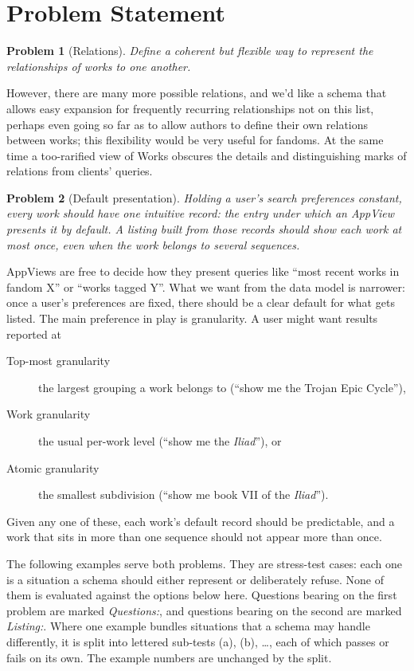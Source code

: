 \documentclass{amsart}
\newtheorem*{prob}{Problem}
\theoremstyle{remark}
\begin{document}
    \section{Problem Statement}
    \begin{prob}[Relations]
        Define a coherent but flexible way to represent the relationships of works to one another.
    \end{prob}
    However, there are many more possible relations, and we'd like a schema that allows easy expansion for frequently recurring relationships not on this list, perhaps even going so far as to allow authors to define their own relations between works; this flexibility would be very useful for fandoms. At the same time a too-rarified view of Works obscures the details and distinguishing marks of relations from clients' queries.

    \begin{prob}[Default presentation]
        Holding a user's search preferences constant, every work should have one intuitive \emph{record}: the entry under which an AppView presents it by default. A listing built from those records should show each work at most once, even when the work belongs to several sequences.
    \end{prob}
    AppViews are free to decide how they present queries like ``most recent works in fandom X'' or ``works tagged Y''. What we want from the data model is narrower: once a user's preferences are fixed, there should be a clear default for what gets listed. The main preference in play is granularity. A user might want results reported at
    \begin{description}
      \item[Top-most granularity] the largest grouping a work belongs to (``show me the Trojan Epic Cycle''),
      \item[Work granularity] the usual per-work level (``show me the \textit{Iliad}''), or
      \item[Atomic granularity] the smallest subdivision (``show me book VII of the \textit{Iliad}'').
    \end{description}
    Given any one of these, each work's default record should be predictable, and a work that sits in more than one sequence should not appear more than once.

    The following examples serve both problems. They are stress-test cases: each one is a situation a schema should either represent or deliberately refuse. None of them is evaluated against the options below here. Questions bearing on the first problem are marked \emph{Questions:}, and questions bearing on the second are marked \emph{Listing:}. Where one example bundles situations that a schema may handle differently, it is split into lettered sub-tests (a), (b), \ldots, each of which passes or fails on its own. The example numbers are unchanged by the split.
\end{document}
